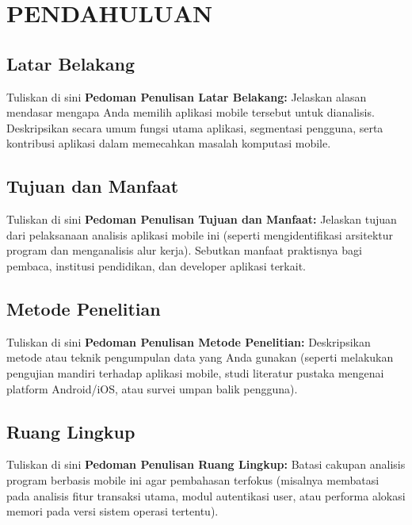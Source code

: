 \chapter{PENDAHULUAN}
\section{Latar Belakang}


Tuliskan di sini \textbf{Pedoman Penulisan Latar Belakang:} Jelaskan alasan mendasar mengapa Anda memilih aplikasi mobile tersebut untuk dianalisis. Deskripsikan secara umum fungsi utama aplikasi, segmentasi pengguna, serta kontribusi aplikasi dalam memecahkan masalah komputasi mobile.


\section{Tujuan dan Manfaat}


Tuliskan di sini \textbf{Pedoman Penulisan Tujuan dan Manfaat:} Jelaskan tujuan dari pelaksanaan analisis aplikasi mobile ini (seperti mengidentifikasi arsitektur program dan menganalisis alur kerja). Sebutkan manfaat praktisnya bagi pembaca, institusi pendidikan, dan developer aplikasi terkait.


\section{Metode Penelitian}


Tuliskan di sini \textbf{Pedoman Penulisan Metode Penelitian:} Deskripsikan metode atau teknik pengumpulan data yang Anda gunakan (seperti melakukan pengujian mandiri terhadap aplikasi mobile, studi literatur pustaka mengenai platform Android/iOS, atau survei umpan balik pengguna).


\section{Ruang Lingkup}


Tuliskan di sini \textbf{Pedoman Penulisan Ruang Lingkup:} Batasi cakupan analisis program berbasis mobile ini agar pembahasan terfokus (misalnya membatasi pada analisis fitur transaksi utama, modul autentikasi user, atau performa alokasi memori pada versi sistem operasi tertentu).

